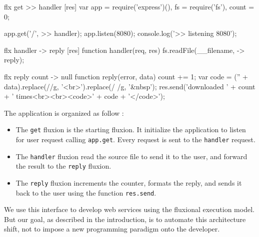 





\begin{code}[flx, caption={Fluxional sample},label={lst:fluxional}]
flx get
>> handler [res]
  var app = require('express')(),
      fs = require('fs'),
      count = 0;

  app.get('/', >> handler);
  app.listen(8080);
  console.log('>> listening 8080');

flx handler
-> reply [res]
  function handler(req, res) {
    fs.readFile(__filename, -> reply);
  }

flx reply {count}
-> null
  function reply(error, data) {
    count += 1;
    var code = ('' + data).replace(/\n/g, '<br>').replace(/ /g, '&nbsp');
    res.send('downloaded ' + count + ' times<br><br><code>' + code + '</code>');
  }
\end{code}

The application is organized as follow :
\begin{itemize}
  \item The \texttt{get} fluxion is the starting fluxion.
  It initialize the application to listen for user request calling \texttt{app.get}.
  Every request is sent to the \texttt{handler} request.
  \item The \texttt{handler} fluxion read the source file to send it to the user, and forward the result to the \texttt{reply} fluxion.
  \item The \texttt{reply} fluxion increments the counter, formats the reply, and sends it back to the user using the function \texttt{res.send}.
\end{itemize}

We use this interface to develop web services using the fluxional execution model.
But our goal, as described in the introduction, is to automate this architecture shift, not to impose a new programming paradigm onto the developer.


